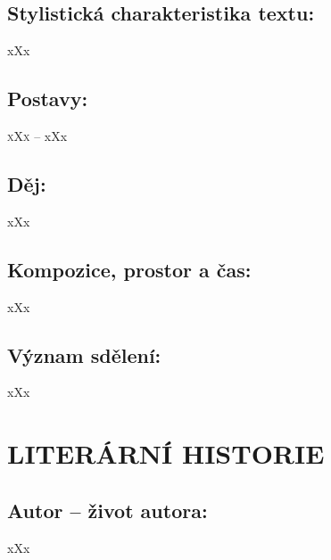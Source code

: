 \documentclass[A4paper]{extarticle} %
\begin{document}
\subsection*{Stylistická charakteristika textu:}
\noindent 
xXx

\subsection*{Postavy:}
\noindent 
\textsc{xXx --} xXx \\

\subsection*{Děj:}
\noindent 
xXx

\subsection*{Kompozice, prostor a čas:}
\noindent 
xXx

\subsection*{Význam sdělení:}
\noindent 
xXx

\section*{LITERÁRNÍ HISTORIE}





\subsection*{Autor {\ssmall -- život autora:}}
\noindent 
xXx
\end{document}
